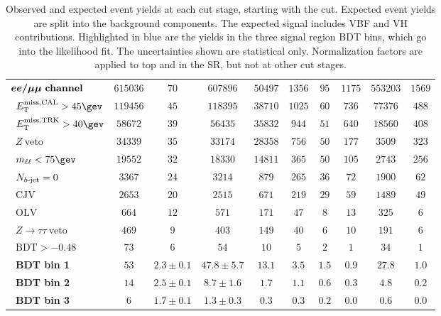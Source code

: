 \begin{table}[h]
\begin{center}
{\begin{tabular}{l || c c c | c c c c c c }
\hline
$\boldsymbol{ee/\mu\mu~\textrm{{\bf channel}}}$ & $615036$ & $70$ & $607896$ & $50497$ &
$1356$ & $95$ & $1175$ & $553203$ & $1569$ \\
\ $\calomet > 45 \gev$ & $119456$ & $45$ & $118395$ & $38710$ & $1025$ &
$60$ & $736$ & $77376$ & $488$ \\
\ $\trkmet > 40 \gev$ & $58672$ & $39$ & $56435$ & $35832$ & $944$ &
$51$ & $640$ & $18560$ & $408$ \\
\ $Z~\textrm{veto}$ & $34339$ & $35$ & $33174$ & $28358$ & $756$ & $50$
& $177$ & $3509$ & $323$ \\
\ $\mll < 75 \gev$ & $19552$ & $32$ & $18330$ & $14811$ & $365$ & $50$ &
$105$ & $2743$ & $256$ \\
\ $N_{b\textrm{-jet}} = 0$ & $3367$ & $24$ & $3214$ & $879$ & $265$ & $36$ & $72$ &
$1900$ & $62$ \\
\ $\textrm{CJV}$ & $2653$ & $20$ & $2515$ & $671$ & $219$ & $29$ & $59$
& $1489$ & $49$ \\
\ $\textrm{OLV}$ & $664$ & $12$ & $571$ & $171$ & $47$ & $8$ & $13$ &
$325$ & $6$ \\
\ $Z\rightarrow{\tau\tau}~\textrm{veto}$ & $469$ & $9$ & $403$ & $149$ &
$40$ & $6$ & $10$ & $191$ & $6$ \\
\ $\textrm{BDT} > -0.48$ & $73$ & $6$ & $54$ & $10$ & $5$ & $2$ & $1$ &
$34$ & $1$ \\
\hline
\ {\bf\color{blue}BDT bin 1} & $53$ & $2.3 \pm 0.1$ & $47.8 \pm 5.7$ & $13.1$
& $3.5$ & $1.5$ & $0.9$ & $27.8$ & $1.0$ \\
\ {\bf\color{blue}BDT bin 2} & $14$ & $2.5 \pm 0.1$ & $8.7 \pm 1.6$ & $1.7$ &
$1.1$ & $0.6$ & $0.3$ & $4.8$ & $0.2$ \\
\ {\bf\color{blue}BDT bin 3} & $6$ & $1.7 \pm 0.1$ & $1.3 \pm 0.3$ & $0.3$ &
$0.3$ & $0.2$ & $0.0$ & $0.6$ & $0.0$ \\
\hline
\end{tabular}
}
\caption[]{Observed and expected event yields at each cut stage,
starting with the \Njet cut. Expected event yields are split into the
background components. The expected signal includes VBF and VH
contributions. Highlighted in {\color{blue}blue} are the yields in the
three signal region BDT bins, which go into the likelihood fit. The uncertainties
shown are statistical only. Normalization factors are applied to top
and \ZDY in the SR, but not at other cut stages.}
\label{chap:analysis:tab:signal_region_cutflow}
\end{center}
\end{table}

